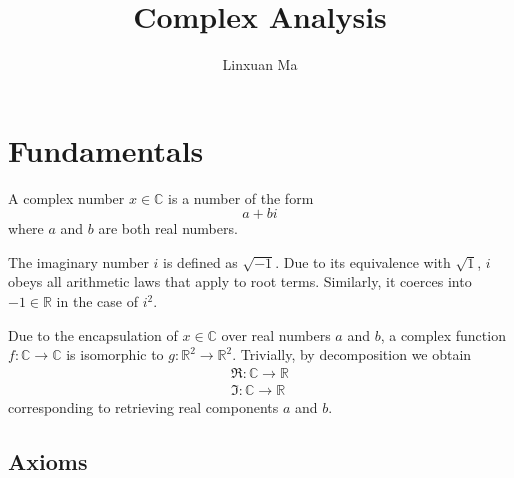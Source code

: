 \documentclass[12pt]{article}
\title{Complex Analysis}
\author{Linxuan Ma}
\begin{document}
	\maketitle
	
	
	\section{Fundamentals}
	A complex number $x \in \mathbb{C}$ is a number of the form $$a + bi$$ where $a$ and $b$ are both real numbers.
	
	
	The imaginary number $i$ is defined as $\sqrt{-1}$. Due to its equivalence with $\sqrt{1}$, $i$ obeys all arithmetic laws that apply to root terms. Similarly, it coerces into $-1 \in \mathbb{R}$ in the case of $i^2$.
	
	Due to the encapsulation of $x \in \mathbb{C}$ over real numbers $a$ and $b$, a complex function $f: \mathbb{C} \to \mathbb{C}$ is isomorphic to $g: \mathbb{R}^2 \to \mathbb{R}^2$. Trivially, by decomposition we obtain
	\begin{gather*}
		\Re: \mathbb{C} \to \mathbb{R} \\
		\Im: \mathbb{C} \to \mathbb{R}
	\end{gather*}
	corresponding to retrieving real components $a$ and $b$.
	
	\subsection{Axioms}
	
\end{document}
